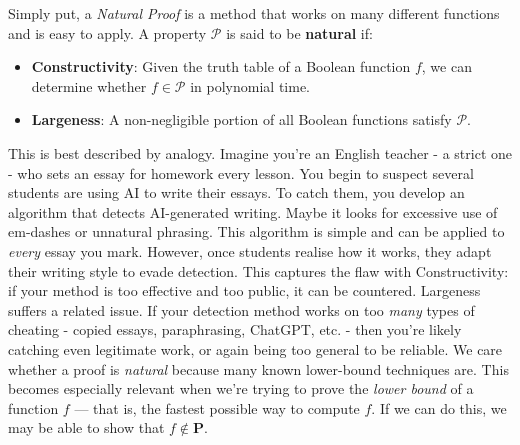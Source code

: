 \documentclass[12pt]{report}
\begin{document}
Simply put, a \textit{Natural Proof} is a method that works on many different functions and is easy to apply.  
A property $\mathcal{P}$ is said to be \textbf{natural} if:
\begin{itemize}
    \item \textbf{Constructivity}: Given the truth table of a Boolean function $f$, we can determine whether $f \in \mathcal{P}$ in polynomial time.
    \item \textbf{Largeness}: A non-negligible portion of all Boolean functions satisfy $\mathcal{P}$.
\end{itemize}
This is best described by analogy.  
Imagine you're an English teacher - a strict one - who sets an essay for homework every lesson. You begin to suspect several students are using AI to write their essays.  
To catch them, you develop an algorithm that detects AI-generated writing. Maybe it looks for excessive use of em-dashes or unnatural phrasing.
This algorithm is simple and can be applied to \textit{every} essay you mark.  
However, once students realise how it works, they adapt their writing style to evade detection.  
This captures the flaw with Constructivity: if your method is too effective and too public, it can be countered.
Largeness suffers a related issue. If your detection method works on too \textit{many} types of cheating - copied essays, paraphrasing, ChatGPT, etc. - then you're likely catching even legitimate work, or again being too general to be reliable.
\vspace{1cm}
\newline
We care whether a proof is \textit{natural} because many known lower-bound techniques are.  
This becomes especially relevant when we're trying to prove the \textit{lower bound} of a function $f$ — that is, the fastest possible way to compute $f$.  
If we can do this, we may be able to show that $f \notin \mathbf{P}$.
\end{document}
